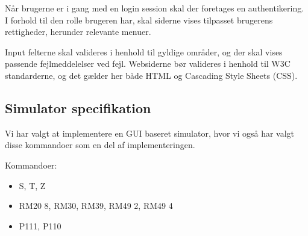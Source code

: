 \documentclass[a4paper]{article}
\begin{document}
Når brugerne er i gang med en login session skal der foretages en authentikering. I forhold til den rolle brugeren har, skal siderne vises tilpasset brugerens rettigheder, herunder relevante menuer.

Input felterne skal valideres i henhold til gyldige områder, og der skal vises passende fejlmeddelelser ved fejl. Websiderne bør valideres i henhold til W3C standarderne, og det gælder her både HTML og Cascading Style Sheets (CSS).


\subsection{Simulator specifikation} %

Vi har valgt at implementere en GUI baseret simulator, hvor vi også har valgt disse kommandoer som en del af implementeringen.

Kommandoer:

\begin{itemize}
  \item S, T, Z
  \item RM20 8, RM30, RM39, RM49 2, RM49 4
  \item P111, P110
\end{itemize}


\end{document}
